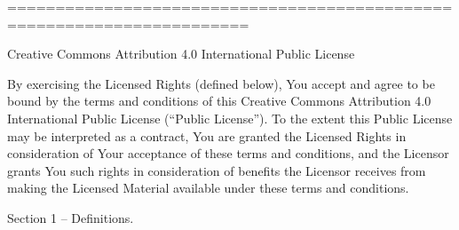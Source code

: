 \documentclass[]{article}
\begin{document}
=======================================================================

Creative Commons Attribution 4.0 International Public License

By exercising the Licensed Rights (defined below), You accept and agree
to be bound by the terms and conditions of this Creative Commons
Attribution 4.0 International Public License (``Public License''). To
the extent this Public License may be interpreted as a contract, You are
granted the Licensed Rights in consideration of Your acceptance of these
terms and conditions, and the Licensor grants You such rights in
consideration of benefits the Licensor receives from making the Licensed
Material available under these terms and conditions.

Section 1 -- Definitions.
\end{document}

